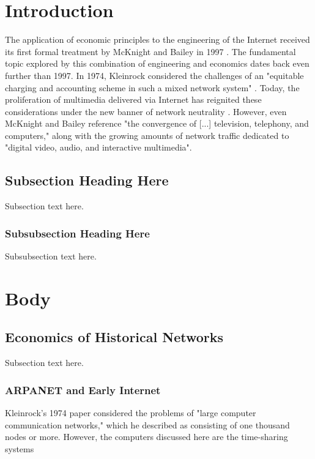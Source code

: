 \documentclass[conference]{IEEEtran}
\begin{document}
\section{Introduction}
The application of economic principles to the engineering of the Internet received its first formal treatment by McKnight and Bailey in 1997 \cite{mcknightbailey97}. The fundamental topic explored by this combination of engineering and economics dates back even further than 1997. In 1974, Kleinrock considered the challenges of an "equitable charging and accounting scheme in such a mixed network system" \cite{kleinrock74}. Today, the proliferation of multimedia delivered via Internet has reignited these considerations under the new banner of network neutrality \cite{faulhaber11}. However, even McKnight and Bailey reference "the convergence of [...] television, telephony, and computers," along with the growing amounts of network traffic dedicated to "digital video, audio, and interactive multimedia".

\subsection{Subsection Heading Here}
Subsection text here.

\subsubsection{Subsubsection Heading Here}
Subsubsection text here.


\section{Body}

\subsection{Economics of Historical Networks}
Subsection text here.

\subsubsection{ARPANET and Early Internet}
Kleinrock's 1974 paper considered the problems of "large computer communication networks," which he described as consisting of one thousand nodes or more. However, the computers discussed here are the time-sharing systems
\end{document}
